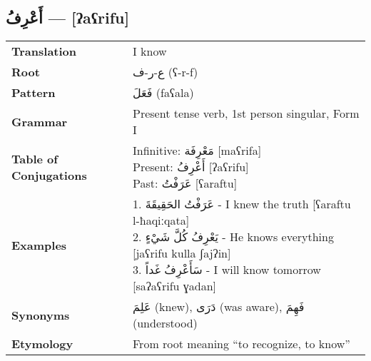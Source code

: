 \documentclass[a4paper,12pt]{article}
\begin{document}
\subsection{\textarabic{أَعْرِفُ} — [ʔaʕrifu]}
\begin{tabular}{p{3cm}p{10cm}}
\toprule
\textbf{Translation} & I know \\
\textbf{Root} & \textarabic{ع-ر-ف} (ʕ-r-f) \\
\textbf{Pattern} & \textarabic{فَعَلَ} (faʕala) \\
\textbf{Grammar} & Present tense verb, 1st person singular, Form I \\
\textbf{Table of Conjugations} & \makecell[l]{
Infinitive: \textarabic{مَعْرِفَة} [maʕrifa]\\
Present: \textarabic{أَعْرِفُ} [ʔaʕrifu]\\
Past: \textarabic{عَرَفْتُ} [ʕaraftu]
} \\
\textbf{Examples} & \makecell[l]{\parbox{9.5cm}{
1. \textarabic{عَرَفْتُ الحَقِيقَةَ} - I knew the truth [ʕaraftu l-ħaqiːqata]\\
2. \textarabic{يَعْرِفُ كُلَّ شَيْءٍ} - He knows everything [jaʕrifu kulla ʃajʔin]\\
3. \textarabic{سَأَعْرِفُ غَداً} - I will know tomorrow [saʔaʕrifu ɣadan]
}} \\
\midrule
\textbf{Synonyms} & \textarabic{عَلِمَ} (knew), \textarabic{دَرَى} (was aware), \textarabic{فَهِمَ} (understood) \\
\textbf{Etymology} & From root meaning ``to recognize, to know'' \\
\bottomrule
\end{tabular}
\end{document}
